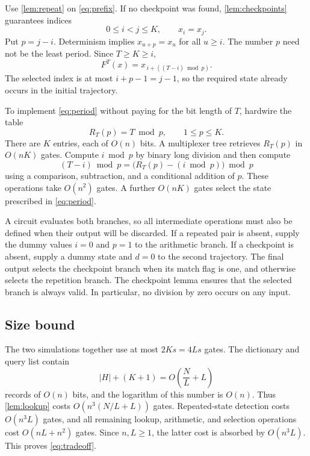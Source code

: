 \documentclass[11pt]{article}
\theoremstyle{definition}
\theoremstyle{remark}
\numberwithin{equation}{section}
\begin{document}
Use \cref{lem:repeat} on \cref{eq:prefix}.  If no checkpoint was found,
\cref{lem:checkpoints} guarantees indices
\[
  0\leq i<j\leq K,\qquad x_i=x_j.
\]
Put $p=j-i$.  Determinism implies $x_{u+p}=x_u$ for all $u\geq i$.
The number $p$ need not be the least period.  Since $T\geq K\geq i$,
\begin{equation}\label{eq:period}
  F^T(x)=x_{\,i+((T-i)\bmod p)}.
\end{equation}
The selected index is at most $i+p-1=j-1$, so the required state already
occurs in the initial trajectory.

To implement \cref{eq:period} without paying for the bit length of $T$,
hardwire the table
\begin{equation}\label{eq:residue-table}
  R_T(p)=T\bmod p,\qquad 1\leq p\leq K.
\end{equation}
There are $K$ entries, each of $O(n)$ bits.  A multiplexer tree retrieves
$R_T(p)$ in $O(nK)$ gates.  Compute $i\bmod p$ by binary long division
and then compute
\[
  (T-i)\bmod p
    =\bigl(R_T(p)-(i\bmod p)\bigr)\bmod p
\]
using a comparison, subtraction, and a conditional addition of $p$.
These operations take $O(n^2)$ gates.  A further $O(nK)$ gates select the
state prescribed in \cref{eq:period}.

A circuit evaluates both branches, so all intermediate operations must
also be defined when their output will be discarded.  If a repeated pair
is absent, supply the dummy values $i=0$ and $p=1$ to the arithmetic
branch.  If a checkpoint is absent, supply a dummy state and $d=0$ to
the second trajectory.  The final output selects the checkpoint branch
when its match flag is one, and otherwise selects the repetition branch.
The checkpoint lemma ensures that the selected branch is always valid.
In particular, no division by zero occurs on any input.

\subsection{Size bound}

The two simulations together use at most $2Ks=4Ls$ gates.  The dictionary
and query list contain
\[
  |H|+(K+1)=O\!\left(\frac{N}{L}+L\right)
\]
records of $O(n)$ bits, and the logarithm of this number is $O(n)$.
Thus \cref{lem:lookup} costs
$O(n^3(N/L+L))$ gates.  Repeated-state detection costs $O(n^3L)$ gates,
and all remaining lookup, arithmetic, and selection operations cost
$O(nL+n^2)$ gates.  Since $n,L\geq 1$, the latter cost is absorbed by
$O(n^3L)$.  This proves \cref{eq:tradeoff}.
\end{document}
